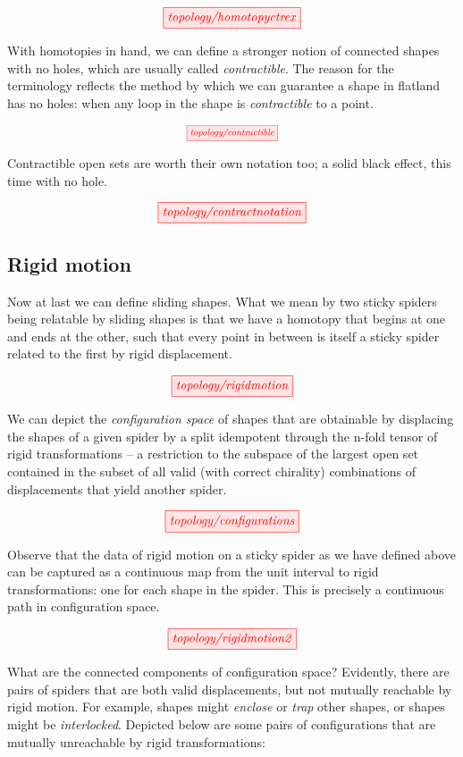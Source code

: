 \begin{fullwidth}
\[\tikzfig{topology/homotopyctrex}\]


With homotopies in hand, we can define a stronger notion of connected shapes with no holes, which are usually called \emph{contractible}. The reason for the terminology reflects the method by which we can guarantee a shape in flatland has no holes: when any loop in the shape is \emph{contractible} to a point.

\[\scalebox{0.75}{\tikzfig{topology/contractible}}\]

Contractible open sets are worth their own notation too; a solid black effect, this time with no hole.

\[\tikzfig{topology/contractnotation}\]

\subsection{Rigid motion}\label{sec:rigidmotion}

Now at last we can define sliding shapes. What we mean by two sticky spiders being relatable by sliding shapes is that we have a homotopy that begins at one and ends at the other, such that every point in between is itself a sticky spider related to the first by rigid displacement.

\[\tikzfig{topology/rigidmotion}\]


We can depict the \emph{configuration space} of shapes that are obtainable by displacing the shapes of a given spider by a split idempotent through the n-fold tensor of rigid transformations -- a restriction to the subspace of the largest open set contained in the subset of all valid (with correct chirality) combinations of displacements that yield another spider.

\[\tikzfig{topology/configurations}\]

Observe that the data of rigid motion on a sticky spider as we have defined above can be captured as a continuous map from the unit interval to rigid transformations: one for each shape in the spider. This is precisely a continuous path in configuration space.

\[\tikzfig{topology/rigidmotion2}\]

What are the connected components of configuration space? Evidently, there are pairs of spiders that are both valid displacements, but not mutually reachable by rigid motion. For example, shapes might \emph{enclose} or \emph{trap} other shapes, or shapes might be \emph{interlocked}. Depicted below are some pairs of configurations that are mutually unreachable by rigid transformations:


\end{fullwidth}
